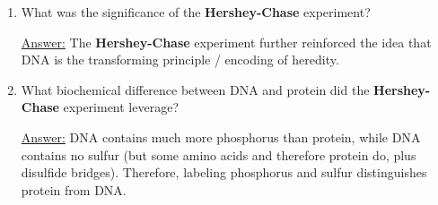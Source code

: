 \documentclass{article}
\newenvironment{QandA}{\begin{enumerate}[label=\bfseries Q\arabic*.]}
                       {\end{enumerate}}
\newenvironment{answered}{\par\normalfont\underline{Answer:}}{}
\begin{document}
\begin{QandA}
\begin{answered}
\begin{itemize}
      \item{4. Sulfur outside $\implies$ protein doesn't really enter.}
      \item{5. Phosphorus inside $\implies$ DNA does enter the cell.}
    \end{itemize}
    \end{answered}
  \item{What was the significance of the \textbf{Hershey-Chase} experiment?}
    \begin{answered}
    The \textbf{Hershey-Chase} experiment further reinforced the idea that DNA is the transforming principle / encoding of heredity.
    \end{answered}
  \item{What biochemical difference between DNA and protein did the \textbf{Hershey-Chase} experiment leverage?}
    \begin{answered}
    DNA contains much more phosphorus than protein, while DNA contains no sulfur (but some amino acids and therefore protein do, plus disulfide bridges). Therefore, labeling phosphorus and sulfur distinguishes protein from DNA.
    \end{answered}
\end{QandA}
\end{document}
